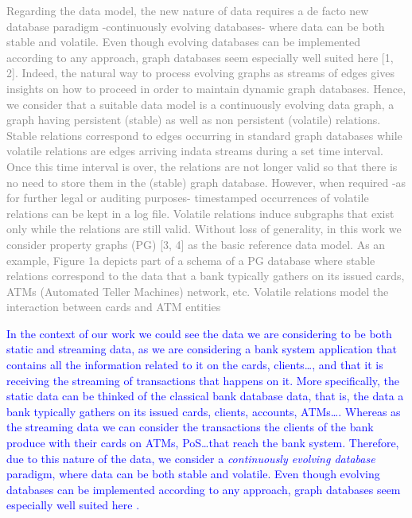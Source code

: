 
\newpage

\textcolor{gray}{
Regarding the data model, the new nature of data requires a de facto new database paradigm
-continuously evolving databases- where data can be both stable and volatile. Even though
evolving databases can be implemented according to any approach, graph databases seem
especially well suited here [1, 2]. Indeed, the natural way to process evolving graphs as streams
of edges gives insights on how to proceed in order to maintain dynamic graph databases. Hence,
we consider that a suitable data model is a continuously evolving data graph, a graph having
persistent (stable) as well as non persistent (volatile) relations. Stable relations correspond
to edges occurring in standard graph databases while volatile relations are edges arriving indata streams during a set time interval. Once this time interval is over, the relations are not
longer valid so that there is no need to store them in the (stable) graph database. However,
when required -as for further legal or auditing purposes- timestamped occurrences of volatile
relations can be kept in a log file. Volatile relations induce subgraphs that exist only while the
relations are still valid. Without loss of generality, in this work we consider property graphs
(PG) [3, 4] as the basic reference data model. As an example, Figure 1a depicts part of a schema
of a PG database where stable relations correspond to the data that a bank typically gathers
on its issued cards, ATMs (Automated Teller Machines) network, etc. Volatile relations model
the interaction between cards and ATM entities}


\textcolor{blue}{In the context of our work we could see the data we are considering to be both static and streaming data, as we are considering a bank system application that contains all the information related to it on the cards, clients\dots, and that it is receiving the streaming of transactions that happens on it.
More specifically, the static data can be thinked of the classical bank database data, that is, the data a bank typically gathers on its issued cards, clients, accounts, ATMs\dots. Whereas as the streaming data we can consider the transactions the clients of the bank produce with their cards on ATMs, PoS\dots that reach the bank system.
Therefore, due to this nature of the data, we consider a \emph{continuously evolving database} paradigm, where data can be both stable and volatile. Even though 
evolving databases can be implemented according to any approach, graph databases seem especially well suited here \textcolor{blue}{\cite{angles2008survey, kumar2015graph}}. 
}


